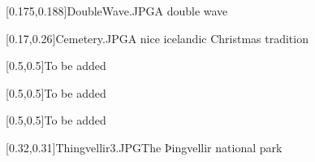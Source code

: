 



\graphicspath{{Figures/}{Figures/Iceland/}}


\subtitle{Day 5}
\date{30.10.2020}


    
    [0.175,0.188]{DoubleWave.JPG}{A double wave}
    
    
    [0.17,0.26]{Cemetery.JPG}{A nice icelandic Christmas tradition}
    
    [0.5,0.5]{}{To be added}
    
    [0.5,0.5]{}{To be added}
    
    [0.5,0.5]{}{To be added}
    
    [0.32,0.31]{Thingvellir3.JPG}{The Þingvellir national park}
    

